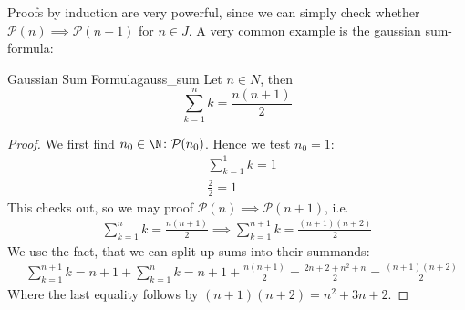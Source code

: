 Proofs by induction are very powerful, since we can simply check whether $\mathcal{P}(n)\implies\mathcal{P}(n+1)$
for $n\in J$. A very common example is the gaussian sum-formula:
\begin{theorem}{Gaussian Sum Formula}{gauss_sum}
    Let $n\in N$, then
    \begin{equation}
        \sum_{k= 1}^{n} k = \frac{n(n+1)}{2}\label{eq:gauss_sum}
    \end{equation}
\end{theorem}
\begin{proof}
    We first find $n_0\in\N\colon \mathcal{P}(n_0)$. Hence we test $n_0=1$:
    \begin{align*}
        &\sum_{k= 1}^{1} k = 1\\
        &\frac{2}{2} = 1
    \end{align*}
    This checks out, so we may proof $\mathcal{P}(n)\implies\mathcal{P}(n+1)$, i.e.
    \begin{align*}
        \sum_{k= 1}^{n}k = \frac{n(n+1)}{2} \implies \sum_{k= 1}^{n+1}k = \frac{(n+1)(n+2)}{2}
    \end{align*}
    We use the fact, that we can split up sums into their summands:
    \begin{align*}
        &\sum_{k= 1}^{n+1}k = n+1 + \sum_{k= 1}^{n}k = n+1 + \frac{n(n+1)}{2} = \frac{2n+2+n^2+n}{2}
        =\frac{(n+1)(n+2)}{2}
    \end{align*}
    Where the last equality follows by $(n+1)(n+2) = n^2+3n+2$.
\end{proof}
